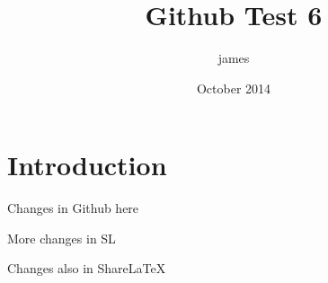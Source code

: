 \documentclass{article}
\title{Github Test 6}
\author{james }
\date{October 2014}
\begin{document}
\maketitle

\section{Introduction}

Changes in Github here

More changes in SL

Changes also in ShareLaTeX
\end{document}
